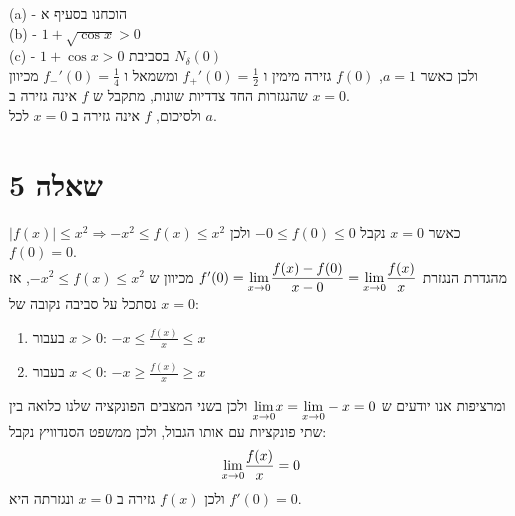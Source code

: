 \documentclass{article}
\begin{document}
	(a) - הוכחנו בסעיף א \\
	(b) - $1 + \sqrt{\cos x} > 0$ \\
	(c) - $1 + \cos x > 0$ בסביבת $N_\delta(0)$ \\
	ולכן כאשר $a = 1$, $f(0)$ גזירה מימין ו $f_+'(0) = \frac{1}{2}$ ומשמאל ו $f_-'(0) = \frac{1}{4}$
	מכיוון שהנגזרות החד צדדיות שונות, מתקבל ש $f$ אינה גזירה ב $x=0$. \\
	ולסיכום, $f$ אינה גזירה ב $x=0$ לכל $a$.

	\section*{שאלה 5}
	$|f(x)| \leq x^2 \Rightarrow -x^2 \leq f(x) \leq x^2$
	כאשר $x = 0$ נקבל $-0 \leq f(0) \leq 0$ ולכן $f(0) = 0$. \\
	מהגדרת הנגזרת $f'(0) = \displaystyle{\lim_{x \to 0}}\frac{f(x) - f(0)}{x-0} = \displaystyle{\lim_{x \to 0}}\frac{f(x)}{x}$
	מכיוון ש $-x^2 \leq f(x) \leq x^2$, אז נסתכל על סביבה נקובה של $x=0$:
	\begin{enumerate}
		\item בעבור $x > 0$: $-x \leq \frac{f(x)}{x} \leq x$
		\item בעבור $x < 0$: $-x \geq \frac{f(x)}{x} \geq x$
	\end{enumerate}
	ומרציפות אנו יודעים ש $\displaystyle{\lim_{x \to 0}} x = \displaystyle{\lim_{x \to 0}} -x = 0$
	ולכן בשני המצבים הפונקציה שלנו כלואה בין שתי פונקציות עם אותו הגבול, ולכן ממשפט הסנדוויץ נקבל:
	\[ \displaystyle{\lim_{x \to 0}} \frac{f(x)}{x} = 0 \]
	ולכן $f(x)$ גזירה ב $x = 0$ ונגזרתה היא $f'(0) = 0$.
\end{document}
